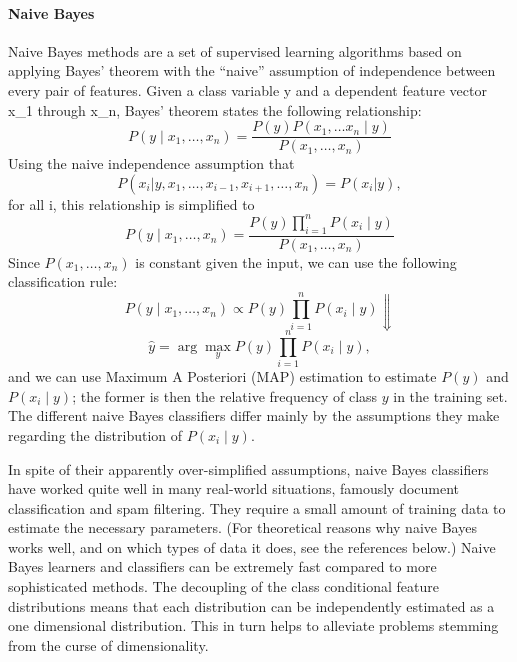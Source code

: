 \paragraph{Naive Bayes}
\label{naiveBayes}
Naive Bayes methods are a set of supervised learning algorithms based on
applying Bayes' theorem with the ``naive'' assumption of independence between
every pair of features.
%
Given a class variable y and a dependent feature vector x\_1 through x\_n,
Bayes' theorem states the following relationship:
\begin{equation}
P(y \mid x_1, \dots, x_n) = \frac{P(y) P(x_1, \dots x_n \mid y)}
{P(x_1, \dots, x_n)}
\end{equation}
Using the naive independence assumption that
\begin{equation}
P(x_i | y, x_1, \dots, x_{i-1}, x_{i+1}, \dots, x_n) = P(x_i | y),
\end{equation}
for all i, this relationship is simplified to
\begin{equation}
P(y \mid x_1, \dots, x_n) = \frac{P(y) \prod_{i=1}^{n} P(x_i \mid y)}
{P(x_1, \dots, x_n)}
\end{equation}
Since $P(x_1, \dots, x_n)$ is constant given the input, we can use the following
classification rule:
\begin{equation}
P(y \mid x_1, \dots, x_n) \propto P(y) \prod_{i=1}^{n} P(x_i \mid y)
\Downarrow
\end{equation}
\begin{equation}
\hat{y} = \arg\max_y P(y) \prod_{i=1}^{n} P(x_i \mid y),
\end{equation}
and we can use Maximum A Posteriori (MAP) estimation to estimate $P(y)$ and
$P(x_i \mid y)$; the former is then the relative frequency of class $y$ in the
training set.
%
The different naive Bayes classifiers differ mainly by the assumptions they make
regarding the distribution of $P(x_i \mid y)$.

In spite of their apparently over-simplified assumptions, naive Bayes
classifiers have worked quite well in many real-world situations, famously
document classification and spam filtering.
%
They require a small amount of training data to estimate the necessary
parameters.
%
(For theoretical reasons why naive Bayes works well, and on which types of data
it does, see the references below.)
Naive Bayes learners and classifiers can be extremely fast compared to more
sophisticated methods.
%
The decoupling of the class conditional feature distributions means that each
distribution can be independently estimated as a one dimensional distribution.
%
This in turn helps to alleviate problems stemming from the curse of
dimensionality.

